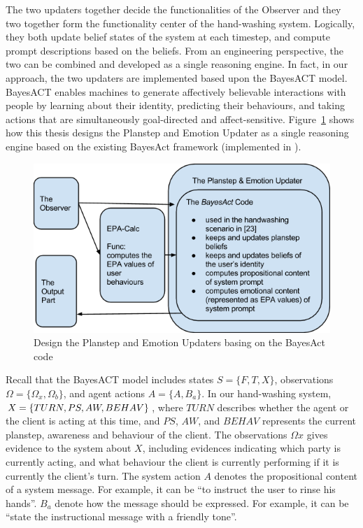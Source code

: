 The two updaters together decide the functionalities of the Observer and they two together form the functionality center of the hand-washing system. Logically, they both update belief states of the system at each timestep, and compute prompt descriptions based on the beliefs. From an engineering perspective, the two can be combined and developed as a single reasoning engine. In fact, in our approach, the two updaters are implemented based upon the BayesACT model. BayesACT enables machines to generate affectively believable interactions with people by learning about their identity, predicting their behaviours, and taking actions that are simultaneously goal-directed and affect-sensitive. Figure~\ref{fig:updater} shows how this thesis designs the Planstep and Emotion Updater as a single reasoning engine based on the existing BayesAct framework (implemented in \cite{hoey2013bayesian}).

\begin{figure}[h!]
\centering
\includegraphics[width=0.8\linewidth]{fig/updater.png}
\caption{Design the Planstep and Emotion Updaters basing on the BayesAct code}
\label{fig:updater}
\end{figure}

Recall that the BayesACT model includes states $S = \{F, T, X\}$, observations $\Omega = \{\Omega_{x}, \Omega_{b}\}$, and agent actions $A = \{A, B_{a}\}$. In our hand-washing system, $X = \{TURN, PS, \\ AW, BEHAV\}$, where $TURN$ describes whether the agent or the client is acting at this time, and $PS$, $AW$, and $BEHAV$ represents the current planstep, awareness and behaviour of the client. The observations $\Omega{x}$ gives evidence to the system about $X$, including evidences indicating which party is currently acting, and what behaviour the client is currently performing if it is currently the client's turn. The system action $A$ denotes the propositional content of a system message. For example, it can be ``to instruct the user to rinse his hands''. $B_{a}$ denote how the message should be expressed. For example, it can be ``state the instructional message with a friendly tone''.

